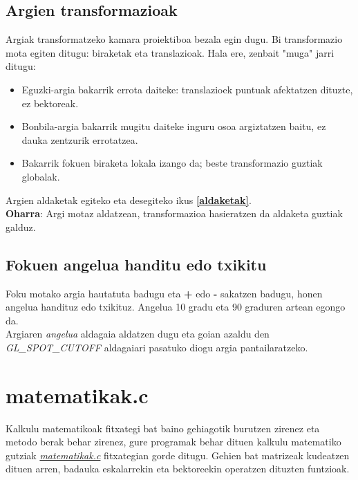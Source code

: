 \documentclass[12pt]{article}
\newcommand{\fitxategi}[1] {\underline{\textit{#1}}}
\newcommand{\aldagai}[1] {\textit{#1}}
\newcommand{\tekla}[1] {\textbf{#1}}
\newcommand{\erref}[1] {\textbf{\ref{#1}}}
\begin{document}
\subsection{Argien transformazioak}

Argiak transformatzeko kamara proiektiboa bezala egin dugu. Bi transformazio mota egiten ditugu: biraketak eta translazioak. Hala ere, zenbait "muga" jarri ditugu:

\begin{itemize}
\item Eguzki-argia bakarrik errota daiteke: translazioek puntuak afektatzen dituzte, ez bektoreak.

\item Bonbila-argia bakarrik mugitu daiteke inguru osoa argiztatzen baitu, ez dauka zentzurik errotatzea.

\item Bakarrik fokuen biraketa lokala izango da; beste transformazio guztiak globalak.
\end{itemize}

Argien aldaketak egiteko eta desegiteko ikus \erref{aldaketak}.\\

\textbf{Oharra}: Argi motaz aldatzean, transformazioa hasieratzen da aldaketa guztiak galduz.

\subsection{Fokuen angelua handitu edo txikitu}

Foku motako argia hautatuta badugu eta \tekla{+} edo \tekla{-} sakatzen badugu, honen angelua handituz edo txikituz. Angelua 10 gradu eta 90 graduren artean egongo da.\\

Argiaren \aldagai{angelua} aldagaia aldatzen dugu eta goian azaldu den \aldagai{GL\_SPOT\_CUTOFF} aldagaiari pasatuko diogu argia pantailaratzeko.\\

\section{matematikak.c}\label{matematikak}

Kalkulu matematikoak fitxategi bat baino gehiagotik burutzen zirenez eta metodo berak behar zirenez, gure programak behar dituen kalkulu matematiko gutziak \fitxategi{matematikak.c} fitxategian gorde ditugu. Gehien bat matrizeak kudeatzen dituen arren, badauka eskalarrekin eta bektoreekin operatzen dituzten funtzioak.\\
\end{document}
